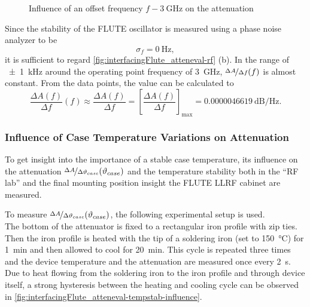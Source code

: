 \begin{figure}[tb]
    \centering
        \subfloat[$f=f_o \SI{+-30}{\kHz}$]{}
        \qquad
        \subfloat[$f=f_o \SI{+-1}{\kHz}$]{}
       \caption{Influence of an offset frequency $f-\SI{3}{\GHz}$ on the attenuation }
    \label{fig:interfacingFlute_atteneval-rf}
\end{figure}

Since the stability of the FLUTE oscillator is measured using a phase noise analyzer to be
\begin{equation}
\sigma_f = \SI{0}{\hertz},
\end{equation}
it is sufficient to regard \autoref{fig:interfacingFlute_atteneval-rf} (b). In the range of \SI{\pm1}{\kHz} around the operating point frequency of \SI{3}{\GHz}, $\nicefrac{\Delta A}{\Delta f} (f)$ is almost constant. From the data points, the value can be calculated to
\begin{equation}
\frac{\Delta A(f)}{\Delta f}(f) 
\approx \frac{\Delta A(f)}{\Delta f} 
= \left[\frac{\Delta A(f)}{\Delta f}\right]_\text{max}
=\SI{0.0000046619}{\dB\per\hertz}.
\end{equation}

\subsubsection{Influence of Case Temperature Variations on Attenuation}
To get insight into the importance of a stable case temperature, its influence on the attenuation $\nicefrac{\Delta A}{\Delta \vartheta_{case}} (\vartheta_{case})$ and the temperature stability both in the ``RF lab'' and the final mounting position insight the FLUTE LLRF cabinet are measured.

To measure $\nicefrac{\Delta A}{\Delta \vartheta_{case}} (\vartheta_{case})$, the following experimental setup is used.\\
The bottom of the attenuator is fixed to a rectangular iron profile with zip ties. Then the iron profile is heated with the tip of a soldering iron (set to \SI{150}{\degreeCelsius}) for \SI{1}{\minute} and then allowed to cool for \SI{20}{\minute}. This cycle is repeated three times and the device temperature and the attenuation are measured once every \SI{2}{\second}. Due to heat flowing from the soldering iron to the iron profile and through device itself, a strong hysteresis between the heating and cooling cycle can be observed in \autoref{fig:interfacingFlute_atteneval-tempstab-influence}.

